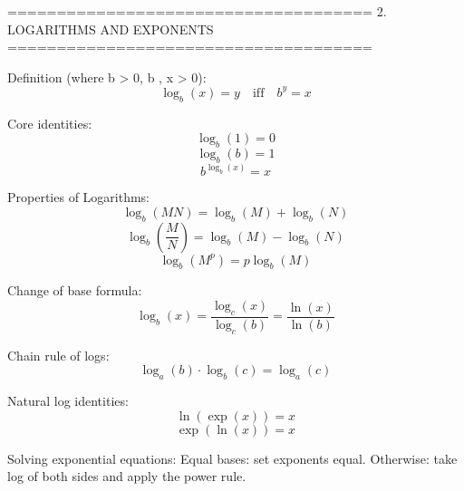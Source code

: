 =====================================
2. LOGARITHMS AND EXPONENTS
=====================================

Definition (where b > 0, b , x > 0):
$$\log_b(x) = y \quad \text{iff} \quad b^y = x$$

Core identities:
$$\log_b(1) = 0$$
$$\log_b(b) = 1$$
$$b^{\log_b(x)} = x$$

Properties of Logarithms:
$$\log_b(MN) = \log_b(M) + \log_b(N)$$
$$\log_b\left(\frac{M}{N}\right) = \log_b(M) - \log_b(N)$$
$$\log_b(M^p) = p \log_b(M)$$

Change of base formula:
$$\log_b(x) = \frac{\log_c(x)}{\log_c(b)} = \frac{\ln(x)}{\ln(b)}$$

Chain rule of logs:
$$\log_a(b) \cdot \log_b(c) = \log_a(c)$$

Natural log identities:
$$\ln(\exp(x)) = x$$
$$\exp(\ln(x)) = x$$

Solving exponential equations:
Equal bases: set exponents equal.
Otherwise: take log of both sides and apply the power rule.
